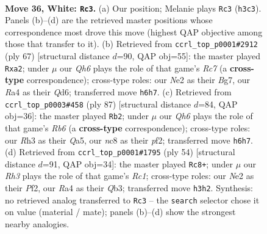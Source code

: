 \documentclass[11pt]{article}
\begin{document}
\clearpage

\begin{figure}[p]\centering
\begin{subfigure}{0.46\textwidth}\centering
\resizebox{\linewidth}{!}{%
\newchessgame
\chessboard[
  setfen={1rn5/5k2/p2p2pQ/3Pr2p/Rpq1p2P/7R/4NPP1/5K2 w - - 3 36},
  showmover=false,
  pgfstyle=straightmove, color=movearrow, markmove={h3-c3}
]}
\caption{}
\end{subfigure}\hfill
\begin{subfigure}{0.46\textwidth}\centering
\resizebox{\linewidth}{!}{%
\newchessgame
\chessboard[
  setfen={6k1/6b1/3q2p1/pQ1P1p1p/8/1P2P1PP/P1r5/3R1NK1 b - - 9 34},
  showmover=false,
  pgfstyle=straightmove, color=movearrow, markmove={c2-a2}
]}
\caption{}
\end{subfigure}
\\[4pt]
\begin{subfigure}{0.46\textwidth}\centering
\resizebox{\linewidth}{!}{%
\newchessgame
\chessboard[
  setfen={3r2k1/2p2pp1/2P3n1/q5P1/3PQ1Rp/1r6/5P1P/3R1B1K b - - 3 44},
  showmover=false,
  pgfstyle=straightmove, color=movearrow, markmove={b3-b2}
]}
\caption{}
\end{subfigure}\hfill
\begin{subfigure}{0.46\textwidth}\centering
\resizebox{\linewidth}{!}{%
\newchessgame
\chessboard[
  setfen={1n4k1/5p2/1r2pqp1/1p5p/3PB3/1Q4P1/5P1P/2R3K1 w - - 0 28},
  showmover=false,
  pgfstyle=straightmove, color=movearrow, markmove={c1-c8}
]}
\caption{}
\end{subfigure}
\caption{\textbf{Move 36, White: \texttt{Rc3}.} (a) Our position; Melanie plays \texttt{Rc3} (\texttt{h3c3}). Panels (b)--(d) are the retrieved master positions whose correspondence most drove this move (highest QAP objective among those that transfer to it). (b) Retrieved from \texttt{ccrl\_top\_p0001\#2912} (ply 67) [structural distance $d$=90, QAP obj=55]: the master played \texttt{Rxa2}; under $\mu$ our \emph{Qh6} plays the role of that game's \emph{Rc7} (a \textbf{cross-type} correspondence); cross-type roles: our \emph{N}e2 as their \emph{B}g7, our \emph{R}a4 as their \emph{Q}d6; transferred move \texttt{h6h7}. (c) Retrieved from \texttt{ccrl\_top\_p0003\#458} (ply 87) [structural distance $d$=84, QAP obj=36]: the master played \texttt{Rb2}; under $\mu$ our \emph{Qh6} plays the role of that game's \emph{Rb6} (a \textbf{cross-type} correspondence); cross-type roles: our \emph{R}h3 as their \emph{Q}a5, our \emph{n}c8 as their \emph{p}f2; transferred move \texttt{h6h7}. (d) Retrieved from \texttt{ccrl\_top\_p0001\#1795} (ply 54) [structural distance $d$=91, QAP obj=34]: the master played \texttt{Rc8+}; under $\mu$ our \emph{Rh3} plays the role of that game's \emph{Rc1}; cross-type roles: our \emph{N}e2 as their \emph{P}f2, our \emph{R}a4 as their \emph{Q}b3; transferred move \texttt{h3h2}. Synthesis: no retrieved analog transferred to \texttt{Rc3} -- the \texttt{search} selector chose it on value (material / mate); panels (b)--(d) show the strongest nearby analogies.}
\label{fig:thought-m70}
\end{figure}
\end{document}

